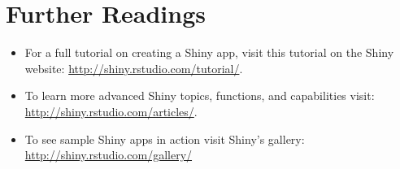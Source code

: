 \section{Further Readings}
\begin{itemize}
\item For a full tutorial on creating a Shiny app, visit this tutorial on the Shiny website: \url{http://shiny.rstudio.com/tutorial/}.
\item To learn more advanced Shiny topics, functions, and capabilities visit: \url{http://shiny.rstudio.com/articles/}.
\item To see sample Shiny apps in action visit Shiny's gallery: \url{http://shiny.rstudio.com/gallery/}
\end{itemize}
